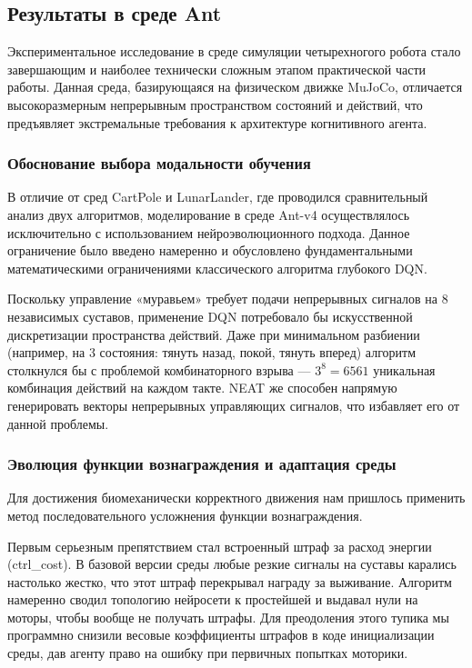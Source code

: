 \subsection{Результаты в среде Ant}

Экспериментальное исследование в среде симуляции четырехногого робота стало завершающим и наиболее технически сложным этапом практической части работы. Данная среда, базирующаяся на физическом движке MuJoCo, отличается высокоразмерным непрерывным пространством состояний и действий, что предъявляет экстремальные требования к архитектуре когнитивного агента.


\subsubsection{Обоснование выбора модальности обучения}

В отличие от сред CartPole и LunarLander, где проводился сравнительный анализ двух алгоритмов, моделирование в среде Ant-v4 осуществлялось исключительно с использованием нейроэволюционного подхода. Данное ограничение было введено намеренно и обусловлено фундаментальными математическими ограничениями классического алгоритма глубокого DQN.

Поскольку управление «муравьем» требует подачи непрерывных сигналов на 8 независимых суставов, применение DQN потребовало бы искусственной дискретизации пространства действий. Даже при минимальном разбиении (например, на 3 состояния: тянуть назад, покой, тянуть вперед) алгоритм столкнулся бы с проблемой комбинаторного взрыва — $3^8 = 6561$ уникальная комбинация действий на каждом такте. NEAT же способен напрямую генерировать векторы непрерывных управляющих сигналов, что избавляет его от данной проблемы.


\subsubsection{Эволюция функции вознаграждения и адаптация среды}

Для достижения биомеханически корректного движения нам пришлось применить метод последовательного усложнения функции вознаграждения.

Первым серьезным препятствием стал встроенный штраф за расход энергии (ctrl\_cost). В базовой версии среды любые резкие сигналы на суставы карались настолько жестко, что этот штраф перекрывал награду за выживание. Алгоритм намеренно сводил топологию нейросети к простейшей и выдавал нули на моторы, чтобы вообще не получать штрафы. Для преодоления этого тупика мы программно снизили весовые коэффициенты штрафов в коде инициализации среды, дав агенту право на ошибку при первичных попытках моторики.

